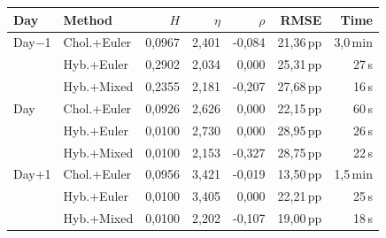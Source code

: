 \begin{tabular}{l l r r r r r}
  \toprule
  \textbf{Day} & \textbf{Method} & \textbf{$H$} & \textbf{$\eta$} & \textbf{$\rho$} & \textbf{RMSE} & \textbf{Time} \\
  \midrule
  Day$-$1 & Chol.+Euler & 0,0967 & 2,401 & -0,084 & 21,36\,pp & 3,0\,min \\
   & Hyb.+Euler & 0,2902 & 2,034 & 0,000 & 25,31\,pp & 27\,s \\
   & Hyb.+Mixed & 0,2355 & 2,181 & -0,207 & 27,68\,pp & 16\,s \\
  \addlinespace[3pt]
  Day & Chol.+Euler & 0,0926 & 2,626 & 0,000 & 22,15\,pp & 60\,s \\
   & Hyb.+Euler & 0,0100 & 2,730 & 0,000 & 28,95\,pp & 26\,s \\
   & Hyb.+Mixed & 0,0100 & 2,153 & -0,327 & 28,75\,pp & 22\,s \\
  \addlinespace[3pt]
  Day$+$1 & Chol.+Euler & 0,0956 & 3,421 & -0,019 & 13,50\,pp & 1,5\,min \\
   & Hyb.+Euler & 0,0100 & 3,405 & 0,000 & 22,21\,pp & 25\,s \\
   & Hyb.+Mixed & 0,0100 & 2,202 & -0,107 & 19,00\,pp & 18\,s \\
  \bottomrule
\end{tabular}